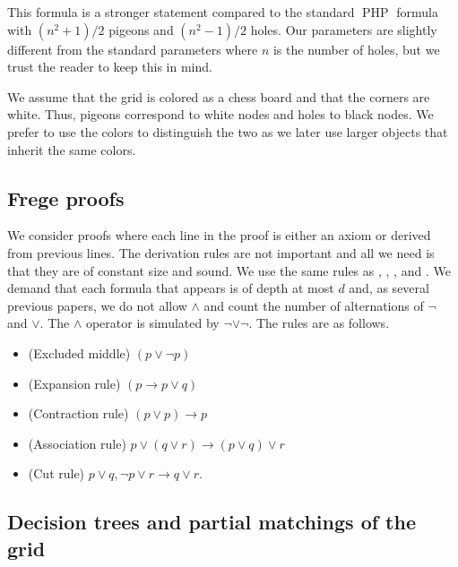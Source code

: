 \documentclass{theoretics}
\DeclareMathOperator{\PHP}{PHP}
\begin{document}
This formula is a stronger statement compared to
the standard $\PHP$ formula with
$(n^2+1)/2$ pigeons and $(n^2-1)/2$ holes.  Our
parameters are slightly different from the standard parameters
where $n$ is the number of holes, but we trust the reader to
keep this in mind.

We assume that the grid is colored as a chess board and
that the corners are white.  Thus, pigeons correspond to white
nodes and holes to black nodes.  We prefer to use the colors to
distinguish the two as we later use larger objects that inherit
the same colors.


\subsection{Frege proofs}\label{sec:frege}

We consider proofs where each line in the proof
is either an axiom or derived from previous lines.
The derivation rules are not important and all we need
is that they are of constant size and sound.  
We use the same rules as \cite{pitassi16frege}, \cite{jhtseitin},
\cite{PRT21}, and \cite{jhkr}.   We demand that each formula that appears
is of depth at most $d$ and, as several previous papers, we do not allow
$\land$ and count the number of alternations of $\neg$ and $\lor$.
The $\land$ operator is simulated by $\neg \lor \neg$.
The rules are as follows.


\begin{itemize}

\item  (Excluded middle) $(p \lor \neg p)$

\item  (Expansion rule) $(p \rightarrow p \lor q)$

\item (Contraction rule) $(p \lor p) \rightarrow p$

\item (Association rule) $p \lor (q \lor r) \rightarrow (p \lor q) \lor r$

\item (Cut rule) $p \lor q, \neg p \lor r \rightarrow q \lor r$. 

\end{itemize}

\subsection{Decision trees and partial matchings of the grid}
\end{document}
